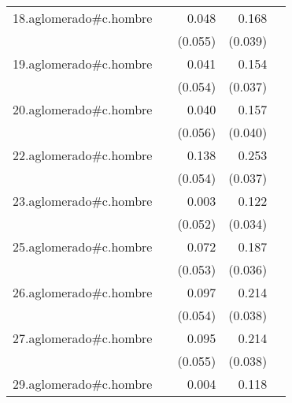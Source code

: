 {\begin{longtable}{l*{4}{D{.}{.}{-1}}}
\addlinespace
18.aglomerado#c.hombre&                     &       0.048         &       0.168\sym{***}&                     \\
            &                     &     (0.055)         &     (0.039)         &                     \\
\addlinespace
19.aglomerado#c.hombre&                     &       0.041         &       0.154\sym{***}&                     \\
            &                     &     (0.054)         &     (0.037)         &                     \\
\addlinespace
20.aglomerado#c.hombre&                     &       0.040         &       0.157\sym{***}&                     \\
            &                     &     (0.056)         &     (0.040)         &                     \\
\addlinespace
22.aglomerado#c.hombre&                     &       0.138\sym{*}  &       0.253\sym{***}&                     \\
            &                     &     (0.054)         &     (0.037)         &                     \\
\addlinespace
23.aglomerado#c.hombre&                     &       0.003         &       0.122\sym{***}&                     \\
            &                     &     (0.052)         &     (0.034)         &                     \\
\addlinespace
25.aglomerado#c.hombre&                     &       0.072         &       0.187\sym{***}&                     \\
            &                     &     (0.053)         &     (0.036)         &                     \\
\addlinespace
26.aglomerado#c.hombre&                     &       0.097         &       0.214\sym{***}&                     \\
            &                     &     (0.054)         &     (0.038)         &                     \\
\addlinespace
27.aglomerado#c.hombre&                     &       0.095         &       0.214\sym{***}&                     \\
            &                     &     (0.055)         &     (0.038)         &                     \\
\addlinespace
29.aglomerado#c.hombre&                     &       0.004         &       0.118\sym{***}&                     \\

\end{longtable}}
